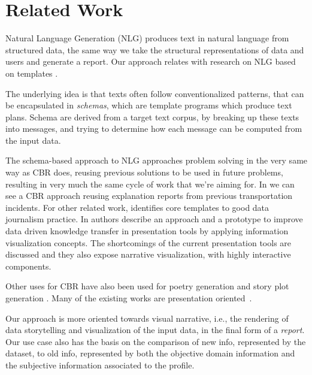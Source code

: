 \section{Related Work}
\label{cap1:sec:relatedwork}

Natural Language Generation (NLG) produces text in natural language from structured data, the same way we take the structural representations of data and users and generate a report.
Our approach relates with research on NLG  based on templates \cite{McKeown}.

The underlying idea is that texts often follow conventionalized patterns, that can be encapsulated in {\it schemas}, which are template programs which produce text plans. 
Schema are derived from a target text corpus, by breaking up these texts into messages, and trying to determine how each message can be computed from the input data. 

The schema-based approach to NLG approaches problem solving in the very same way as CBR does, reusing previous solutions to be used in future problems, resulting in very much the same cycle of work that we're aiming for.
In \cite{sizov2017} we can see a CBR approach reusing explanation reports from previous transportation incidents.
For other related work, \cite{Adegboyega2017} identifies core templates to good data journalism practice.
In \cite{Roels2017} authors describe an approach and a prototype to improve data driven knowledge transfer in presentation tools by applying information visualization concepts. 
The shortcomings of the current presentation tools are discussed and they also expose narrative visualization, with highly interactive components.

Other uses for CBR have also been used for poetry generation \cite{diaz2002} and story plot generation \cite{GervasDPH05}. 
Many of the existing works are presentation oriented~\cite{Kosara16,Roels2017}. 

Our approach is more oriented towards visual narrative, i.e., the rendering of data storytelling and visualization of the input data, in the final form of a {\it report}.
Our use case also has the basis on the comparison of new info, represented by the dataset, to old info, represented by both the objective domain information and the subjective information associated to the profile. 

